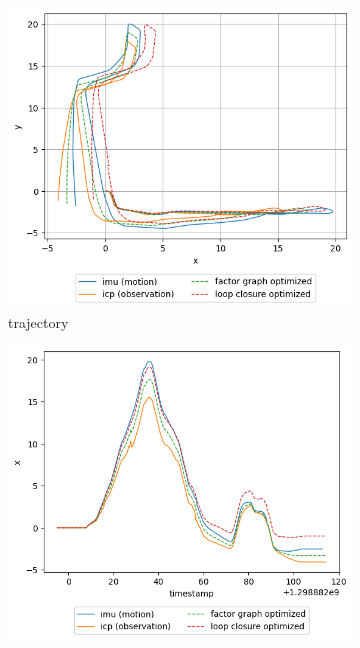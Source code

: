 \documentclass[conference]{IEEEtran}
\begin{document}
\begin{figure}
    \centering
    \begin{subfigure}{0.24\textwidth}
        \includegraphics[width=\linewidth]{../img/trj_21.png}
        \caption{trajectory}
        \label{fig:trj_21}
    \end{subfigure}
    \hfill
    \begin{subfigure}{0.24\textwidth}
        \includegraphics[width=\linewidth]{../img/trj_21_x.png}

\end{subfigure}
\end{figure}
\end{document}
